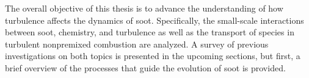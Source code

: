 The overall objective of this thesis is to advance the understanding of how turbulence affects the dynamics of soot. Specifically, the small-scale interactions between soot, chemistry, and turbulence as well as the transport of species in turbulent nonpremixed combustion are analyzed. A survey of previous investigations on both topics is presented in the upcoming sections, but first, a brief overview of the processes that guide the evolution of soot is provided.













